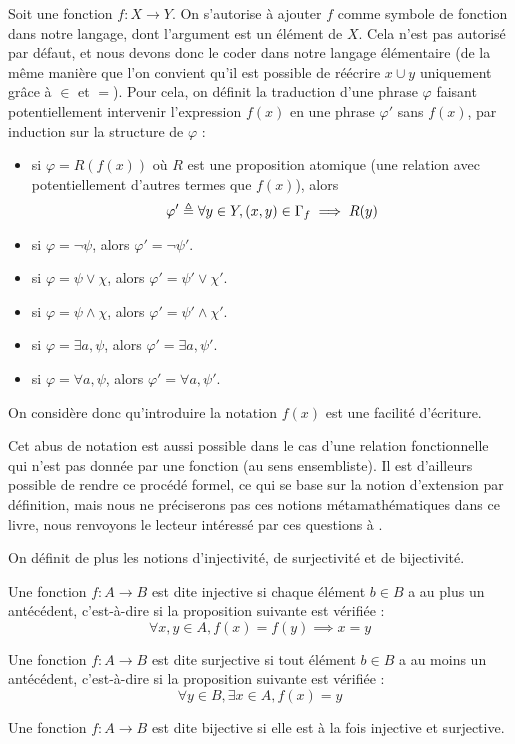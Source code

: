 \begin{notation}
  Soit une fonction $f : X \to Y$. On s'autorise à ajouter $f$ comme symbole de
  fonction dans notre langage, dont l'argument est un élément de $X$. Cela n'est
  pas autorisé par défaut, et nous devons donc le coder dans notre langage
  élémentaire (de la même manière que l'on convient qu'il est possible de
  réécrire $x\cup y$ uniquement grâce à $\in$ et $=$). Pour cela, on définit la
  traduction d'une phrase $\varphi$ faisant potentiellement intervenir
  l'expression $f(x)$ en une phrase $\varphi'$ sans $f(x)$, par induction sur
  la structure de $\varphi$ :
  \begin{itemize}
  \item si $\varphi = R(f(x))$ où $R$ est une proposition atomique (une relation
    avec potentiellement d'autres termes que $f(x)$), alors
    \[\varphi' \triangleq \forall y\in Y, (x,y)\in \Gamma_f \implies R(y)\]
  \item si $\varphi = \lnot \psi$, alors $\varphi' = \lnot \psi'$.
  \item si $\varphi = \psi \lor \chi$, alors $\varphi' = \psi'\lor \chi'$.
  \item si $\varphi = \psi \land \chi$, alors $\varphi' = \psi'\land \chi'$.
  \item si $\varphi = \exists a, \psi$, alors $\varphi' = \exists a, \psi'$.
  \item si $\varphi = \forall a, \psi$, alors $\varphi' = \forall a, \psi'$.
  \end{itemize}

  On considère donc qu'introduire la notation $f(x)$ est une facilité
  d'écriture.
\end{notation}

\begin{remark}
  Cet abus de notation est aussi possible dans le cas d'une relation
  fonctionnelle qui n'est pas donnée par une fonction (au sens ensembliste).
  Il est d'ailleurs possible de rendre ce procédé formel, ce qui se base sur la
  notion d'extension par définition, mais nous ne préciserons pas ces notions
  métamathématiques dans ce livre, nous renvoyons le lecteur intéressé par ces
  questions à \cite{Troelstra1973-TROMIO}.
\end{remark}

On définit de plus les notions d'injectivité, de surjectivité et de bijectivité.

\begin{definition}
  Une fonction $f : A \to B$ est dite injective si chaque élément $b\in B$ a au
  plus un antécédent, c'est-à-dire si la proposition suivante est vérifiée :
  \[\forall x,y\in A, f(x) = f(y)\implies x=y\]

  Une fonction $f : A \to B$ est dite surjective si tout élément $b\in B$ a au
  moins un antécédent, c'est-à-dire si la proposition suivante est vérifiée :
  \[\forall y\in B, \exists x \in A, f(x)=y\]

  Une fonction $f : A \to B$ est dite bijective si elle est à la fois injective
  et surjective.
\end{definition}

